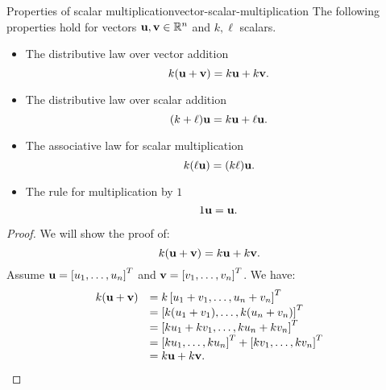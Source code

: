 \begin{theorem}{Properties of scalar multiplication}{vector-scalar-multiplication}
  The following properties hold for vectors
  $\mbox{\bf u},\mbox{\bf v}\in\mathbb{R}^{n}$ and $k,\ell$ scalars.%
  \begin{itemize}
  \item The distributive law over vector addition
    \begin{equation*}
      k (\mbox{\bf u}+\mbox{\bf v}) = k\mbox{\bf u} + k\mbox{\bf v}.
    \end{equation*}
  \item The distributive law over scalar addition
    \begin{equation*}
      (k + \ell) \mbox{\bf u} = k \mbox{\bf u} + \ell \mbox{\bf u}.
    \end{equation*}
  \item The associative law for scalar multiplication
    \begin{equation*}
      k (\ell \mbox{\bf u}) = (k \ell)\mbox{\bf u}.
    \end{equation*}
  \item The rule for multiplication by $1$
    \begin{equation*}
      1\mbox{\bf u}=\mbox{\bf u}.
    \end{equation*}
  \end{itemize}
\end{theorem}

\begin{proof}
We will show the proof of:
\begin{equation*}
k (\mbox{\bf u}+\mbox{\bf v}) = k \mbox{\bf u}+ k \mbox{\bf v}.
\end{equation*}
Assume $\mbox{\bf u}=\left[u_{1},\ldots,u_{n}\right]^T$ and
$\mbox{\bf v}=\left[v_{1},\ldots,v_{n}\right]^T$. We have:
\begin{equation*}
\begin{array}{ll}
k (\mbox{\bf u}+\mbox{\bf v}) & =k \left[u_{1}+v_{1},\ldots,u_{n}+v_{n}\right]^T \\
& = \left[k (u_{1}+v_{1}), \ldots, k (u_{n}+v_{n}) \right]^T \\
& = \left[k u_{1}+ k  v_{1}, \ldots, k u_{n}+ k v_{n}\right]^T \\
& = \left[k u_{1}, \ldots, k u_{n} \right]^T + \left[k v_{1}, \ldots, k v_{n} \right]^T \\
& = k \mbox{\bf u}+k \mbox{\bf v}.
\end{array}
\end{equation*}
\end{proof}

